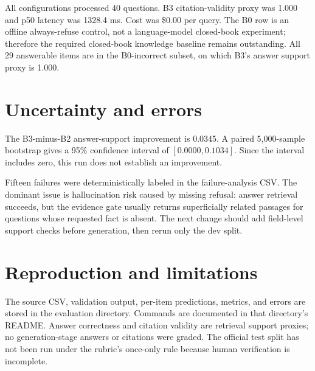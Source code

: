 \documentclass[11pt]{article}
\begin{document}
All configurations processed 40 questions. B3 citation-validity proxy was
1.000 and p50 latency was 1328.4 ms. Cost was \$0.00 per query. The B0 row is
an offline always-refuse control, not a language-model closed-book experiment;
therefore the required closed-book knowledge baseline remains outstanding.
All 29 answerable items are in the B0-incorrect subset, on which B3's answer
support proxy is 1.000.

\section{Uncertainty and errors}

The B3-minus-B2 answer-support improvement is 0.0345. A paired 5,000-sample
bootstrap gives a 95\% confidence interval of $[0.0000, 0.1034]$. Since the
interval includes zero, this run does not establish an improvement.

Fifteen failures were deterministically labeled in the failure-analysis CSV.
The dominant issue is hallucination risk caused by missing refusal: answer retrieval succeeds, but the
evidence gate usually returns superficially related passages for questions
whose requested fact is absent. The next change should add field-level
support checks before generation, then rerun only the dev split.

\section{Reproduction and limitations}

The source CSV, validation output, per-item predictions, metrics, and errors
are stored in the evaluation directory. Commands are documented in that
directory's README. Answer correctness and citation validity are retrieval
support proxies; no generation-stage answers or citations were graded.
The official test split has not been run under the rubric's once-only rule
because human verification is incomplete.
\end{document}
